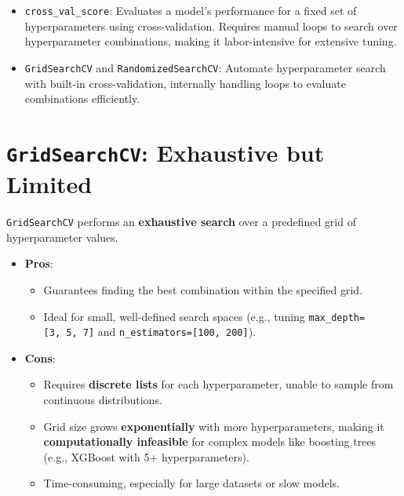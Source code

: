 \documentclass[
  letterpaper,
  DIV=11,
  numbers=noendperiod]{scrreprt}
\providecommand{\tightlist}{%
  \setlength{\itemsep}{0pt}\setlength{\parskip}{0pt}}\usepackage{longtable,booktabs,array}
\begin{document}
\begin{itemize}
\item
  \texttt{cross\_val\_score}: Evaluates a model's performance for a
  fixed set of hyperparameters using cross-validation. Requires manual
  loops to search over hyperparameter combinations, making it
  labor-intensive for extensive tuning.
\item
  \texttt{GridSearchCV} and \texttt{RandomizedSearchCV}: Automate
  hyperparameter search with built-in cross-validation, internally
  handling loops to evaluate combinations efficiently.
\end{itemize}

\section{\texorpdfstring{\texttt{GridSearchCV}: Exhaustive but
Limited}{GridSearchCV: Exhaustive but Limited}}\label{gridsearchcv-exhaustive-but-limited}

\texttt{GridSearchCV} performs an \textbf{exhaustive search} over a
predefined grid of hyperparameter values.

\begin{itemize}
\tightlist
\item
  \textbf{Pros}:

  \begin{itemize}
  \tightlist
  \item
    Guarantees finding the best combination within the specified grid.
  \item
    Ideal for small, well-defined search spaces (e.g., tuning
    \texttt{max\_depth={[}3,\ 5,\ 7{]}} and
    \texttt{n\_estimators={[}100,\ 200{]}}).
  \end{itemize}
\item
  \textbf{Cons}:

  \begin{itemize}
  \tightlist
  \item
    Requires \textbf{discrete lists} for each hyperparameter, unable to
    sample from continuous distributions.
  \item
    Grid size grows \textbf{exponentially} with more hyperparameters,
    making it \textbf{computationally infeasible} for complex models
    like boosting trees (e.g., XGBoost with 5+ hyperparameters).
  \item
    Time-consuming, especially for large datasets or slow models.
  \end{itemize}
\end{itemize}
\end{document}
